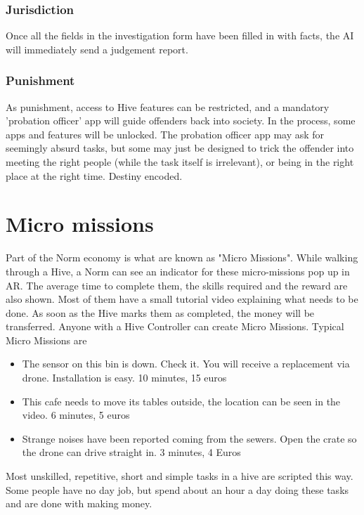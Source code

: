 \subsubsection{Jurisdiction}

Once all the fields in the investigation form have been filled in with facts, the AI will immediately send a judgement report.

\subsubsection{Punishment}

As punishment, access to Hive features can be restricted, and a mandatory 'probation officer' app will guide offenders back into society. In the process, some apps and features will be unlocked. The probation officer app may ask for seemingly absurd tasks, but some may just be designed to trick the offender into meeting the right people (while the task itself is irrelevant), or being in the right place at the right time. Destiny encoded.

\section{Micro missions}

Part of the Norm economy is what are known as "Micro Missions". While walking through a Hive, a Norm can see an indicator for these micro-missions pop up in AR.
The average time to complete them, the skills required and the reward are also shown.
Most of them have a small tutorial video explaining what needs to be done. As soon as the Hive marks them as completed, the money will be transferred.
Anyone with a Hive Controller can create Micro Missions.
Typical Micro Missions are
\begin{itemize}
    \item The sensor on this bin is down. Check it. You will receive a replacement via drone. Installation is easy. 10 minutes, 15 euros
    \item This cafe needs to move its tables outside, the location can be seen in the video. 6 minutes, 5 euros
    \item Strange noises have been reported coming from the sewers. Open the crate so the drone can drive straight in. 3 minutes, 4 Euros
\end{itemize}

Most unskilled, repetitive, short and simple tasks in a hive are scripted this way. Some people have no day job, but spend about an hour a day doing these tasks and are done with making money.

